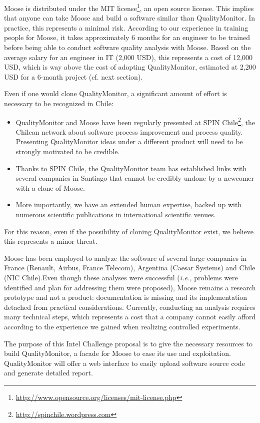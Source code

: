 \documentclass[runningheads]{llncs}
\newcommand{\ie}{\emph{i.e.,}\xspace}
\begin{document}
Moose is distributed under the MIT license\footnote{\url{http://www.opensource.org/licenses/mit-license.php}}, an open source license. This implies that anyone can take Moose and build a software similar than QualityMonitor. In practice, this represents a minimal risk. According to our experience in training people for Moose, it takes approximately 6 months for an engineer to be trained before being able to conduct software quality analysis with Moose. Based on the average salary for an engineer in IT (2,000 USD), this represents a cost of 12,000 USD, which is way above the cost of adopting QualityMonitor, estimated at 2,200 USD for a 6-month project (cf. next section). 

Even if one would clone QualityMonitor, a significant amount of effort is necessary to be recognized in Chile: 
\begin{itemize}
\item QualityMonitor and Moose have been regularly presented at SPIN Chile\footnote{\url{http://spinchile.wordpress.com}}, the Chilean network about software process improvement and process quality. Presenting QualityMonitor ideas under a different product will need to be strongly motivated to be credible.
\item Thanks to SPIN Chile, the QualityMonitor team has established links with several companies in Santiago that cannot be credibly undone by a newcomer with a clone of Moose. 
\item More importantly, we have an extended human expertise, backed up with numerous scientific publications in international scientific venues.
\end{itemize}
For this reason, even if the possibility of cloning QualityMonitor exist, we believe this represents a minor threat.

Moose has been employed to analyze the software of several large companies in France (Renault, Airbus, France Telecom), Argentina (Caesar Systems) and Chile (NIC Chile).Even though these analyses were successful (\ie problems were identified and plan for addressing them were proposed), Moose remains a research prototype and not a product: documentation is missing and its implementation detached from practical considerations. Currently, conducting an analysis requires many technical steps, which represents a cost that a company cannot easily afford according to the experience we gained when realizing controlled experiments.

The purpose of this Intel Challenge proposal is to give the necessary resources to build QualityMonitor, a facade for Moose to ease its use and exploitation. QualityMonitor will offer a  web interface to easily upload software source code and generate detailed report. 
\end{document}
